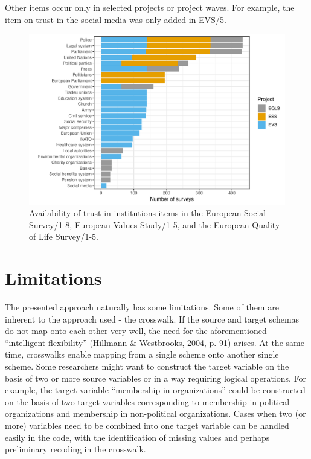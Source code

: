\documentclass[12pt,]{article}
\begin{document}
Other items occur only in selected projects or project waves. For example, the item on trust in the social media was only added in EVS/5.

\begin{figure}
\centering
\includegraphics{Harmonization_working_paper_files/figure-latex/trust-availability-1.pdf}
\caption{\label{fig:trust-availability}Availability of trust in institutions items in the European Social Survey/1-8, European Values Study/1-5, and the European Quality of Life Survey/1-5.}
\end{figure}

\hypertarget{limitations}{%
\section{Limitations}\label{limitations}}

The presented approach naturally has some limitations. Some of them are inherent to the approach used - the crosswalk. If the source and target schemas do not map onto each other very well, the need for the aforementioned ``intelligent flexibility'' (Hillmann \& Westbrooks, \protect\hyperlink{ref-Hillmann2004}{2004}, p. 91) arises. At the same time, crosswalks enable mapping from a single scheme onto another single scheme. Some researchers might want to construct the target variable on the basis of two or more source variables or in a way requiring logical operations. For example, the target variable ``membership in organizations'' could be constructed on the basis of two target variables corresponding to membership in political organizations and membership in non-political organizations. Cases when two (or more) variables need to be combined into one target variable can be handled easily in the code, with the identification of missing values and perhaps preliminary recoding in the crosswalk.
\end{document}
